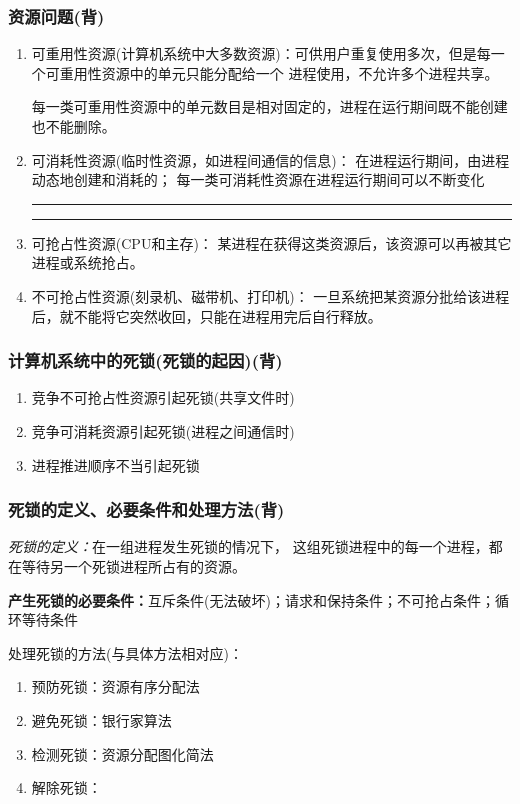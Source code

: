 \documentclass{article}
\begin{document}
\subsubsection{{\color{red}资源问题}{\color{green}(背)}}
\begin{enumerate}
    \item 可重用性资源(计算机系统中大多数资源)：可供用户重复使用多次，但是每一个可重用性资源中的单元只能分配给一个
    进程使用，不允许多个进程共享。

    每一类可重用性资源中的单元数目是相对固定的，进程在运行期间既不能创建也不能删除。
    \item 可消耗性资源(临时性资源，如进程间通信的信息)：
    在进程运行期间，由进程动态地创建和消耗的；
    每一类可消耗性资源在进程运行期间可以不断变化
    \vspace*{0.2cm}
    \hrule    \hrule
    \item 可抢占性资源(CPU和主存)：
    某进程在获得这类资源后，该资源可以再被其它进程或系统抢占。
    \item 不可抢占性资源(刻录机、磁带机、打印机)：
    一旦系统把某资源分批给该进程后，就不能将它突然收回，只能在进程用完后自行释放。
\end{enumerate}

\subsubsection{{\color{red}计算机系统中的死锁(死锁的起因)}{\color{green}(背)}}
\begin{enumerate}
    \item 竞争不可抢占性资源引起死锁(共享文件时)
    \item 竞争可消耗资源引起死锁(进程之间通信时)
    \item 进程推进顺序不当引起死锁
\end{enumerate}

\subsubsection{{\color{red}死锁的定义、必要条件和处理方法}{\color{green}(背)}}
    \textit{死锁的定义：}在一组进程发生死锁的情况下，
    这组死锁进程中的每一个进程，都在等待另一个死锁进程所占有的资源。

    \textbf{产生死锁的必要条件：}{\color{red}互斥条件(无法破坏)；请求和保持条件；不可抢占条件；循环等待条件}

    处理死锁的方法(与具体方法相对应)：
    \begin{enumerate}
        \item 预防死锁：资源有序分配法
        \item 避免死锁：银行家算法
        \item 检测死锁：资源分配图化简法
        \item 解除死锁：
    \end{enumerate}
\end{document}
